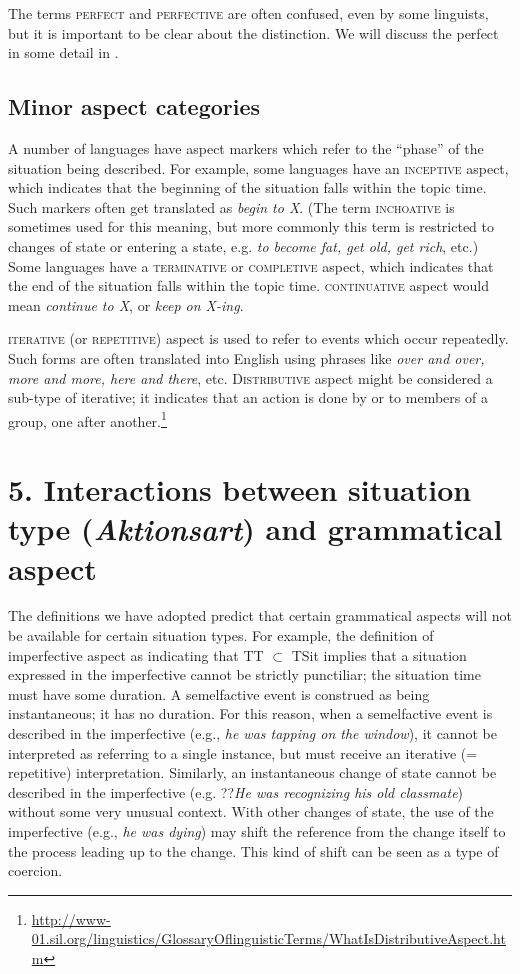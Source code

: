 The terms \textsc{perfect} and \textsc{perfective} are often confused, even by some linguists, but it is important to be clear about the distinction. We will discuss the perfect in some detail in .


\subsection{Minor aspect categories}\label{sec:} %

A number of languages have aspect markers which refer to the “phase” of the situation being described. For example, some languages have an \textsc{inceptive} aspect, which indicates that the beginning of the situation falls within the topic time. Such markers often get translated as \textit{begin to X}. (The term \textsc{inchoative} is sometimes used for this meaning, but more commonly this term is restricted to changes of state or entering a state, e.g. \textit{to become fat, get old, get rich}, etc.) Some languages have a \textsc{terminative} or \textsc{completive} aspect, which indicates that the end of the situation falls within the topic time. \textsc{continuative} aspect would mean \textit{continue to X}, or \textit{keep on X-ing}.



\textsc{iterative} (or \textsc{repetitive}) aspect is used to refer to events which occur repeatedly. Such forms are often translated into English using phrases like \textit{over and over, more and more, here and there}, etc. \textsc{Distributive} aspect might be considered a sub-type of iterative; it indicates that an action is done by or to members of a group, one after another.\footnote{\url{http://www-01.sil.org/linguistics/GlossaryOflinguisticTerms/WhatIsDistributiveAspect.htm}} 


\section{5. Interactions between situation type (\textit{Aktionsart}) and grammatical aspect}\label{sec:}

The definitions we have adopted predict that certain grammatical aspects will not be available for certain situation types. For example, the definition of imperfective aspect as indicating that TT ${\subset}$ TSit implies that a situation expressed in the imperfective cannot be strictly punctiliar; the situation time must have some duration. A semelfactive event is construed as being instantaneous; it has no duration. For this reason, when a semelfactive event is described in the imperfective (e.g., \textit{he was tapping on the window}), it cannot be interpreted as referring to a single instance, but must receive an iterative (= repetitive) interpretation. Similarly, an instantaneous change of state cannot be described in the imperfective (e.g. ??\textit{He was recognizing his old classmate}) without some very unusual context. With other changes of state, the use of the imperfective (e.g., \textit{he was dying}) may shift the reference from the change itself to the process leading up to the change. This kind of shift can be seen as a type of coercion.



